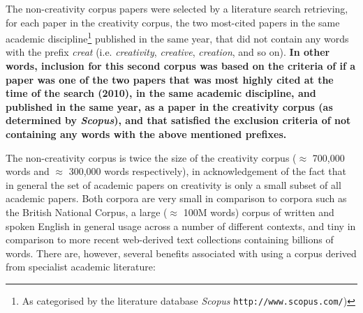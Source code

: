 \documentclass[10pt,letterpaper]{article}
\begin{document}
\vspace{0.25cm}
\begin{center}
\end{center}
\vspace{0.25cm}

The non-creativity corpus papers were selected by a literature search retrieving, for each paper in the creativity corpus, the two most-cited papers in the same academic discipline\footnote{As categorised by the literature database {\em Scopus} \texttt{http://www.scopus.com/})} published in the same year, that did not contain any words with the prefix {\em creat\/} (i.e. {\em creativity\/}, {\em creative\/}, {\em creation\/}, and so on). \textbf{In other words, inclusion for this second corpus was based on the criteria of if a paper was one of the two papers that was most highly cited at the time of the search (2010), in the same academic discipline, and published in the same year, as a paper in the creativity corpus (as determined by {\em Scopus}), and that satisfied the exclusion criteria of not containing any words with the above mentioned prefixes.}

The non-creativity corpus is twice the size of the creativity corpus ($\approx$ 700,000 words and $\approx$ 300,000 words respectively), in acknowledgement of the fact that in general the set of academic papers on creativity is only a small subset of all academic papers. Both corpora are very small in comparison to corpora such as the British National Corpus, a large  ($\approx$ 100M words) corpus of written and spoken English in general usage across a number of different contexts, and tiny in comparison to more recent web-derived text collections containing billions of words. There are, however, several benefits associated with using a corpus derived from specialist academic literature:
\end{document}
